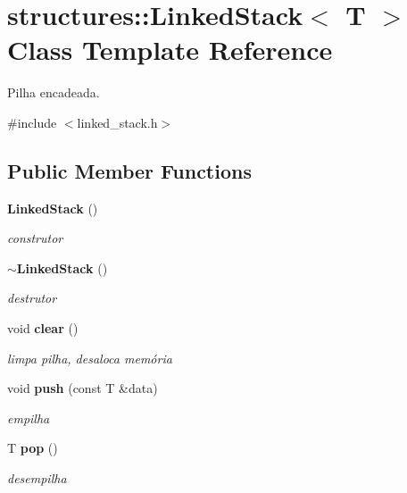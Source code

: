 \section{structures\+::Linked\+Stack$<$ T $>$ Class Template Reference}
\label{classstructures_1_1_linked_stack}


Pilha encadeada.  




{\ttfamily \#include $<$linked\+\_\+stack.\+h$>$}

\subsection*{Public Member Functions}
\begin{DoxyCompactItemize}
\item 
\mbox{\label{classstructures_1_1_linked_stack_a546b827cccaa49b4f470110bc3a9004e}} 
\textbf{ Linked\+Stack} ()
\begin{DoxyCompactList}\small\item\em construtor \end{DoxyCompactList}\item 
\mbox{\label{classstructures_1_1_linked_stack_aae17566eb103c92eb22be2e779286f2f}} 
\textbf{ $\sim$\+Linked\+Stack} ()
\begin{DoxyCompactList}\small\item\em destrutor \end{DoxyCompactList}\item 
\mbox{\label{classstructures_1_1_linked_stack_a56cc909b4a3a0ff7a589f35032ca0ba8}} 
void \textbf{ clear} ()
\begin{DoxyCompactList}\small\item\em limpa pilha, desaloca memória \end{DoxyCompactList}\item 
\mbox{\label{classstructures_1_1_linked_stack_adb8c6b231298ac25b17ba692d510a3fc}} 
void \textbf{ push} (const T \&data)
\begin{DoxyCompactList}\small\item\em empilha \end{DoxyCompactList}\item 
\mbox{\label{classstructures_1_1_linked_stack_a8ff0ba0de594ec26971bb259e1d28c3c}} 
T \textbf{ pop} ()
\begin{DoxyCompactList}\small\item\em desempilha \end{DoxyCompactList}\item 

\end{DoxyCompactItemize}
